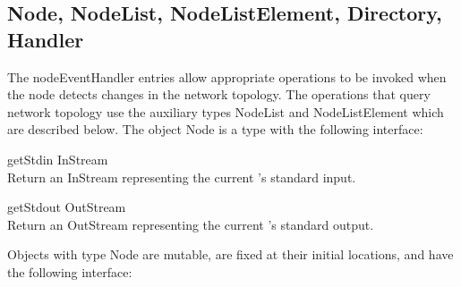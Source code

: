 \subsection{Node, NodeList, NodeListElement, Directory, Handler}
\label{builtin Node}
The nodeEventHandler entries allow appropriate operations to be
invoked when the node detects changes in the network topology.  The
operations that query network topology use the auxiliary types
NodeList and NodeListElement which are described below.  
The object Node is a type with the following interface:

\begin{desc}
  \item[\kw{operation} getStdin \returns{} \/\LB{}InStream\/\RB{}]~\\
    Return an InStream representing the current 's standard input.
  \item[\kw{operation} getStdout \returns{} \/\LB{}OutStream\/\RB{}]~\\
    Return an OutStream representing the current 's standard output.
\end{desc}

\noindent Objects with type Node are mutable, are fixed at their initial
locations, and have the following interface:

